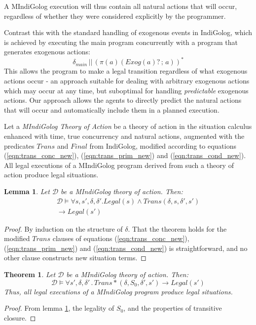 \documentclass[times, 10pt, twocolumn]{article}
\newtheorem{lemma}{Lemma}
\newtheorem{thm}{Theorem}
\begin{document}
A MIndiGolog execution will thus contain all natural actions that
will occur, regardless of whether they were considered explicitly
by the programmer.

Contrast this with the standard handling of exogenous events in IndiGolog,
which is achieved by executing the main program concurrently with
a program that generates exogenous actions:\[
\delta_{main}\,||\,\left(\pi(a)(Exog(a)?\,;\, a)\right)^{*}\]
 This allows the program to make a legal transition regardless of
what exogenous actions occur - an approach suitable for dealing with
arbitrary exogenous actions which may occur at any time, but suboptimal
for handling \emph{predictable} exogenous actions. Our approach allows
the agents to directly predict the natural actions that will occur
and automatically include them in a planned execution.


Let a \emph{MIndiGolog Theory of Action} be a theory of action in
the situation calculus enhanced with time, true concurrency and natural
actions, augmented with the predicates $Trans$ and $Final$ from
IndiGolog, modified according to equations (\ref{eqn:trans_conc_new}),
(\ref{eqn:trans_prim_new}) and (\ref{eqn:trans_cond_new}). All legal
executions of a MIndiGolog program derived from such a theory of action
produce legal situations.
\begin{lemma} Let $\mathcal{D}$ be a MIndiGolog theory of action.
Then:\label{thm:trans_legal}
\begin{multline*}
\mathcal{D}\models\forall s,s',\delta,\delta'.Legal(s)\wedge Trans(\delta,s,\delta',s') \\ \rightarrow Legal(s')
\end{multline*}
\end{lemma} \begin{proof} By induction on the structure of $\delta$.
That the theorem holds for the modified $Trans$ clauses of equations
(\ref{eqn:trans_conc_new}), (\ref{eqn:trans_prim_new}) and (\ref{eqn:trans_cond_new})
is straightforward, and no other clause constructs new situation terms.
\end{proof} 

\begin{thm} Let $\mathcal{D}$ be a MIndiGolog theory of action.
Then: \[
\mathcal{D}\models\forall s',\delta,\delta'\,.\, Trans*(\delta,S_{0},\delta',s')\rightarrow Legal(s')\]
Thus, all legal executions of a MIndiGolog program produce
legal situations. \end{thm} \begin{proof} From lemma \ref{thm:trans_legal},
the legality of $S_{0}$, and the properties of transitive closure.
\end{proof} 
\end{document}
